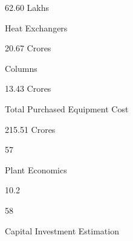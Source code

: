 \documentclass[a4paper,portrait,12pt]{article}
\begin{document}
\begin{flushleft}
62.60 Lakhs
\end{flushleft}





\begin{flushleft}
Heat Exchangers
\end{flushleft}





\begin{flushleft}
20.67 Crores
\end{flushleft}





\begin{flushleft}
Columns
\end{flushleft}





\begin{flushleft}
13.43 Crores
\end{flushleft}





\begin{flushleft}
Total Purchased Equipment Cost
\end{flushleft}





\begin{flushleft}
215.51 Crores
\end{flushleft}





57





\begin{flushleft}
\newpage
Plant Economics
\end{flushleft}





10.2





58





\begin{flushleft}
Capital Investment Estimation
\end{flushleft}
\end{document}
